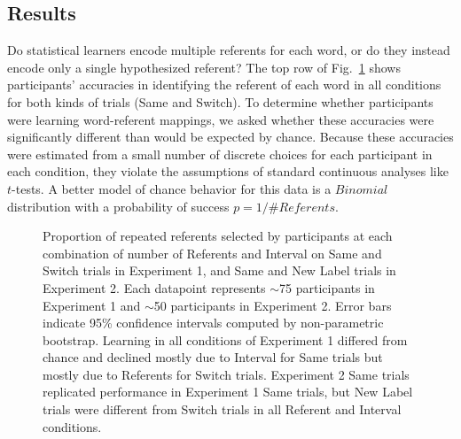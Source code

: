 \documentclass[authoryear,review]{elsarticle}
\begin{document}
\subsection{Results}

Do statistical learners encode multiple referents for each word, or do they instead encode only a single hypothesized referent? The top row of Fig.~\ref{fig:exp1_2_data} shows participants' accuracies in identifying the referent of each word in all conditions for both kinds of trials (Same and Switch). To determine whether participants were learning word-referent mappings, we asked whether these accuracies were significantly different than would be expected by chance. Because these accuracies were estimated from a small number of discrete choices for each participant in each condition, they violate the assumptions of standard continuous analyses like $t$-tests. A better model of chance behavior for this data is a $Binomial$ distribution with a probability of success $p=1/\# Referents$. 

 \begin{figure}[tb]
	\caption{\label{fig:exp1_2_data} Proportion of repeated referents selected by participants at each combination of number of Referents and Interval on Same and Switch trials in Experiment 1, and Same and New Label trials in Experiment 2. Each datapoint represents $\sim$75 participants in Experiment 1 and  $\sim$50 participants in Experiment 2. Error bars indicate 95\% confidence intervals computed by non-parametric bootstrap. Learning in all conditions of Experiment 1 differed from chance and declined mostly due to Interval for Same trials but mostly due to Referents for Switch trials. Experiment 2 Same trials replicated performance in Experiment 1 Same trials, but New Label trials were different from Switch trials in all Referent and Interval conditions.} 
\end{figure}
\end{document}

